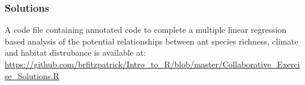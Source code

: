\documentclass[xcolor=dvipsnames]{beamer}
\begin{document}
\begin{frame}[fragile]
\frametitle{Solutions}

A code file containing annotated code to complete a multiple linear regression based analysis of the potential relationships between ant species richness, climate and habitat distrubance is available at:
\newline
\newline
\url{https://github.com/brfitzpatrick/Intro_to_R/blob/master/Collaborative_Exercise_Solutions.R}

\end{frame}
\end{document}
